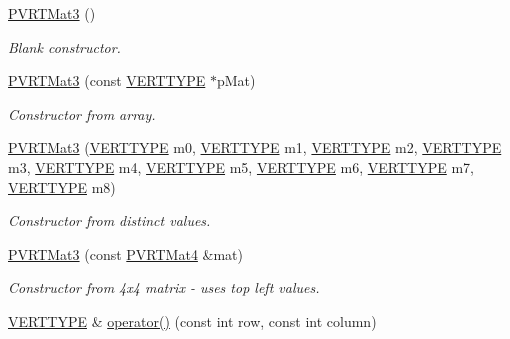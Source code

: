 \begin{DoxyCompactItemize}
\item 
\hyperlink{struct_p_v_r_t_mat3_a381d3dc7ce8f40208aebb1e7910cdaa4}{P\+V\+R\+T\+Mat3} ()
\begin{DoxyCompactList}\small\item\em Blank constructor. \end{DoxyCompactList}\item 
\hyperlink{struct_p_v_r_t_mat3_a4f0bb368e4f182872e415972aeae2e42}{P\+V\+R\+T\+Mat3} (const \hyperlink{group___a_p_i___o_g_l_e_s_ga06da457b7d3e93368ab904f89e1396be}{V\+E\+R\+T\+T\+Y\+P\+E} $\ast$p\+Mat)
\begin{DoxyCompactList}\small\item\em Constructor from array. \end{DoxyCompactList}\item 
\hyperlink{struct_p_v_r_t_mat3_ac93e985ef4dc8370c85f0adbcb9ba4c8}{P\+V\+R\+T\+Mat3} (\hyperlink{group___a_p_i___o_g_l_e_s_ga06da457b7d3e93368ab904f89e1396be}{V\+E\+R\+T\+T\+Y\+P\+E} m0, \hyperlink{group___a_p_i___o_g_l_e_s_ga06da457b7d3e93368ab904f89e1396be}{V\+E\+R\+T\+T\+Y\+P\+E} m1, \hyperlink{group___a_p_i___o_g_l_e_s_ga06da457b7d3e93368ab904f89e1396be}{V\+E\+R\+T\+T\+Y\+P\+E} m2, \hyperlink{group___a_p_i___o_g_l_e_s_ga06da457b7d3e93368ab904f89e1396be}{V\+E\+R\+T\+T\+Y\+P\+E} m3, \hyperlink{group___a_p_i___o_g_l_e_s_ga06da457b7d3e93368ab904f89e1396be}{V\+E\+R\+T\+T\+Y\+P\+E} m4, \hyperlink{group___a_p_i___o_g_l_e_s_ga06da457b7d3e93368ab904f89e1396be}{V\+E\+R\+T\+T\+Y\+P\+E} m5, \hyperlink{group___a_p_i___o_g_l_e_s_ga06da457b7d3e93368ab904f89e1396be}{V\+E\+R\+T\+T\+Y\+P\+E} m6, \hyperlink{group___a_p_i___o_g_l_e_s_ga06da457b7d3e93368ab904f89e1396be}{V\+E\+R\+T\+T\+Y\+P\+E} m7, \hyperlink{group___a_p_i___o_g_l_e_s_ga06da457b7d3e93368ab904f89e1396be}{V\+E\+R\+T\+T\+Y\+P\+E} m8)
\begin{DoxyCompactList}\small\item\em Constructor from distinct values. \end{DoxyCompactList}\item 
\hyperlink{struct_p_v_r_t_mat3_a16e90e5a66d3343b3b815cd8b83ae336}{P\+V\+R\+T\+Mat3} (const \hyperlink{struct_p_v_r_t_mat4}{P\+V\+R\+T\+Mat4} \&mat)
\begin{DoxyCompactList}\small\item\em Constructor from 4x4 matrix -\/ uses top left values. \end{DoxyCompactList}\item 
\hyperlink{group___a_p_i___o_g_l_e_s_ga06da457b7d3e93368ab904f89e1396be}{V\+E\+R\+T\+T\+Y\+P\+E} \& \hyperlink{struct_p_v_r_t_mat3_a3b73044cb1e14e048ebba41db1df99ba}{operator()} (const int row, const int column)

\end{DoxyCompactItemize}
